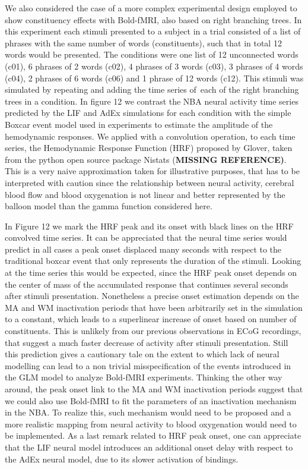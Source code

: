 \documentclass[10pt]{article}
\begin{document}
We also considered the case of a more complex experimental design employed to show constituency effects with Bold-fMRI\cite{Pallier_2011}, also based on right branching trees.
In this experiment each stimuli presented to a subject in a trial consisted of a list of phrases with the same number of words (constituents), such that in total 12 words would be presented.
The conditions were one list of 12 unconnected words (c01), 6 phrases of 2 words (c02), 4 phrases of 3 words (c03), 3 phrases of 4 words (c04), 2 phrases of 6 words (c06) and 1 phrase of 12 words (c12).
This stimuli was simulated by repeating and adding the time series of~each of the right branching trees in a condition.
In figure 12 we contrast the NBA neural activity time series predicted by the LIF and AdEx simulations for each condition with the simple Boxcar event model used in experiments to estimate the amplitude of the hemodynamic responses.
We applied with a convolution operation, to each time series, the Hemodynamic Response Function (HRF) proposed by Glover\cite{Glover_1999}, taken from the python open source package Nistats (\textbf{MISSING REFERENCE)}.
This is a very naive approximation taken for illustrative purposes, that has to be interpreted with caution since the relationship between neural activity, cerebral blood flow and blood oxygenation is not linear\cite{Friston_2000,Buxton_2004} and better represented by the balloon model than the gamma function considered here\cite{Waldorp_2009}.

In Figure 12 we mark the HRF peak and its onset with black lines on the HRF convolved time series.
It can be appreciated that the neural time series would predict in all cases a peak onset displaced many seconds with respect to the traditional boxcar event that only represents the duration of the stimuli.
Looking at the time series this would be expected, since the HRF peak onset depends on the center of mass of the accumulated response that continues several seconds after stimuli presentation.
Nonetheless a precise onset estimation depends on the MA and WM inactivation periods that have been arbitrarily set in the simulation to a constant, which leads to a superlinear increase of onset based on number of constituents.
This is unlikely from our previous observations in ECoG recordings, that suggest a much faster decrease of activity after stimuli presentation.
Still this prediction gives a cautionary tale on the extent to which lack of neural modelling can lead to a non trivial misspecification of the events introduced in the GLM model to analyze Bold-fMRI experiments.
Thinking the other way around, the peak onset link to the MA and WM inactivation periods suggest that we could also use Bold-fMRI to fit the parameters of an inactivation mechanism in the NBA.
To realize this, such mechanism would need to be proposed and a more realistic mapping from neural activity to blood oxygenation would need to be implemented.
As a last remark related to HRF peak onset, one can appreciate that the LIF neural model introduces an additional onset delay with respect to the AdEx neural model, due to its slower activation of bindings.
\end{document}
